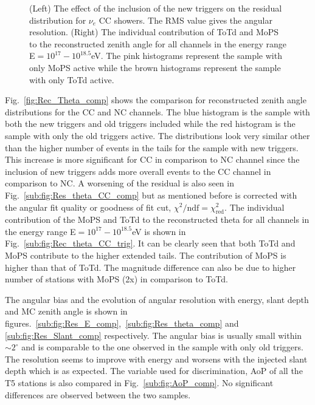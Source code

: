 \begin{figure}[h!]
  \centering
  \hfill
  \caption{(Left) The effect of the inclusion of the new triggers on the residual distribution for $\nu_e$ CC showers. The RMS value gives the angular resolution. (Right) The individual contribution of ToTd and MoPS to the reconstructed zenith angle for all channels in the energy range E$=10^{17}-10^{18.5}$eV. The pink histograms represent the sample with only MoPS active while the brown histograms represent the sample with only ToTd active.}
  \label{fig:Res_Theta_2}
\end{figure}

Fig.~\ref{fig:Rec_Theta_comp} shows the comparison for reconstructed zenith angle distributions for the CC and NC channels. The blue histogram is the sample with both the new triggers and old triggers included while the red histogram is the sample with only the old triggers active. The distributions look very similar other than the higher number of events in the tails for the sample with new triggers. This increase is more significant for CC in comparison to NC channel since the inclusion of new triggers adds more overall events to the CC channel in comparison to NC. A worsening of the residual is also seen in Fig.~\ref{sub:fig:Res_theta_CC_comp} but as mentioned before is corrected with the angular fit quality or goodness of fit cut, $\chi^2/{\text{ndf}} = \chi^2_{\text{red}}$. 
The individual contribution of the MoPS and ToTd to the reconstructed theta for all channels in the energy range E$=10^{17}-10^{18.5}$eV is shown in Fig.~\ref{sub:fig:Rec_theta_CC_trig}. It can be clearly seen that both ToTd and MoPS contribute to the higher extended tails. The contribution of MoPS is higher than that of ToTd. The magnitude difference can also be due to higher number of stations with MoPS (2x) in comparison to ToTd.

The angular bias and the evolution of angular resolution with energy, slant depth and MC zenith angle is shown in figures.~\ref{sub:fig:Res_E_comp},~\ref{sub:fig:Res_theta_comp} and \ref{sub:fig:Res_Slant_comp} respectively. The angular bias is usually small within $\sim 2^{\circ}$ and is comparable to the one observed in the sample with only old triggers. The resolution seems to improve with energy and worsens with the injected slant depth which is as expected. The variable used for discrimination, AoP of all the T5 stations is also compared in Fig.~\ref{sub:fig:AoP_comp}. No significant differences are observed between the two samples. 

